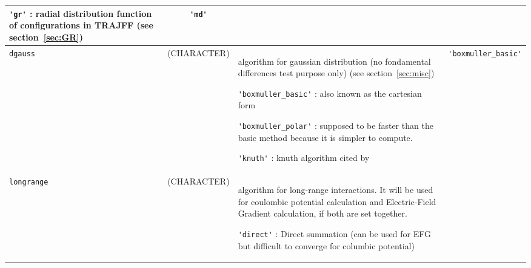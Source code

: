 \documentclass[a4paper]{article}
\begin{document}
\begin{longtable}{l|c|m{8cm}|m{2cm}}
					\verb?'gr'? : radial distribution function of configurations in TRAJFF
					(see section~\ref{sec:GR}) \newline                                                & \verb?'md'?   \tabularnewline
\hline
\rule[-0.75cm]{0cm}{1.5cm}
\verb?dgauss?    & (CHARACTER)        & \newline algorithm for gaussian distribution (no fondamental differences test purpose only) 
                                        (see section~\ref{sec:misc}) \newline  

                                        \verb?'boxmuller_basic'? : also known as the cartesian form  \newline

					\verb?'boxmuller_polar'? : supposed to be faster than the basic method because it is 
					simpler to compute.     \newline

					\verb?'knuth'? : knuth algorithm cited by~\cite{B-ALLEN_TILDESLEY} \newline         & \verb?'boxmuller_basic'? \tabularnewline
\hline
\rule[-0.75cm]{0cm}{1.5cm}
\verb?longrange? & (CHARACTER)        & \newline algorithm for long-range interactions. It will be used for coulombic potential 
                                        calculation and Electric-Field Gradient calculation, if both are set together. \newline

					\verb?'direct'? : Direct summation (can be used for EFG but difficult to converge for columbic potential) \newline


\end{longtable}
\end{document}
